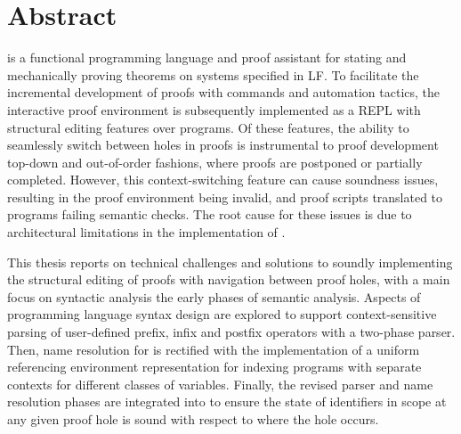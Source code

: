 \chapter*{Abstract}

\Beluga is a functional programming language and proof assistant for stating and mechanically proving theorems on systems specified in \acs{LF}.
To facilitate the incremental development of proofs with commands and automation tactics, the \Harpoon interactive proof environment is subsequently implemented as a \acs{REPL} with structural editing features over \Beluga programs.
Of these features, the ability to seamlessly switch between holes in proofs is instrumental to proof development top-down and out-of-order fashions, where proofs are postponed or partially completed.
However, this context-switching feature can cause soundness issues, resulting in the proof environment being invalid, and proof scripts translated to \Beluga programs failing semantic checks.
The root cause for these issues is due to architectural limitations in the implementation of \Beluga.

This thesis reports on technical challenges and solutions to soundly implementing the structural editing of proofs with navigation between proof holes, with a main focus on syntactic analysis the early phases of semantic analysis.
Aspects of programming language syntax design are explored to support context-sensitive parsing of user-defined prefix, infix and postfix operators with a two-phase parser.
Then, name resolution for \Beluga is rectified with the implementation of a uniform referencing environment representation for indexing programs with separate contexts for different classes of variables.
Finally, the revised parser and name resolution phases are integrated into \Harpoon to ensure the state of identifiers in scope at any given proof hole is sound with respect to where the hole occurs.

